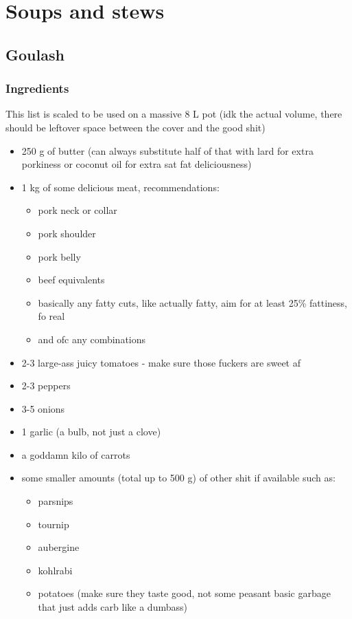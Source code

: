 \documentclass[10pt]{article}
\begin{document}
\section{Soups and stews}%
\label{sec:soups}

\subsection{Goulash}%
\label{sub:goulash}
\subsubsection{Ingredients}%
\label{ssub:goulash_ingredients}
This list is scaled to be used on a massive 8 L pot (idk the actual volume, there should be leftover space between the cover and the good shit)
\begin{itemize}
	\item 250 g of butter (can always substitute half of that with lard for extra porkiness or coconut oil for extra sat fat deliciousness)	
	\item 1 kg of some delicious meat, recommendations:
		\begin{itemize}
			\item pork neck or collar
			\item pork shoulder
			\item pork belly
			\item beef equivalents
			\item basically any fatty cuts, like actually fatty, aim for at least 25\% fattiness, fo real
			\item and ofc any combinations
		\end{itemize}
	\item 2-3 large-ass juicy tomatoes - make sure those fuckers are sweet af
	\item 2-3 peppers
	\item 3-5 onions
	\item 1 garlic (a bulb, not just a clove)
	\item a goddamn kilo of carrots
	\item some smaller amounts (total up to 500 g) of other shit if available such as:
		\begin{itemize}
			\item parsnips
			\item tournip
			\item aubergine
			\item kohlrabi
			\item potatoes (make sure they taste good, not some peasant basic garbage that just adds carb like a dumbass)

\end{itemize}
\end{itemize}
\end{document}
